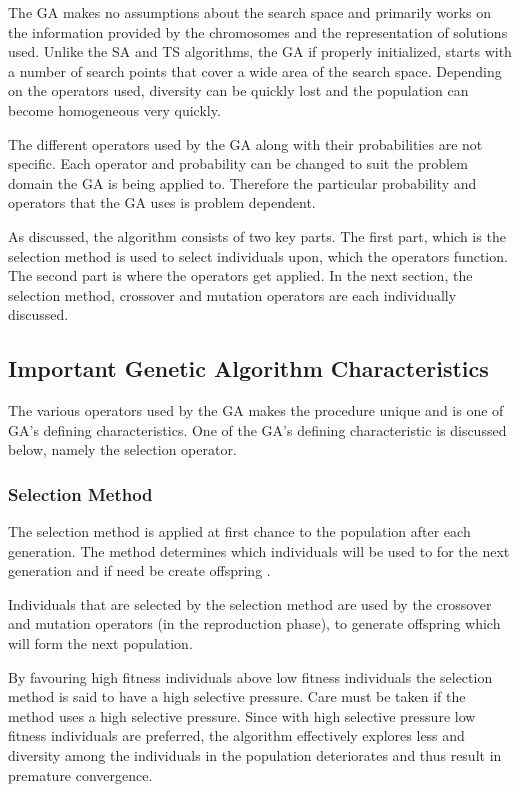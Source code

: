 The \gls{GA} makes no assumptions about the search space and primarily works on the information provided by the chromosomes and the representation of solutions used\cite{CompuIntelligenceIntro,ConstrainedGA,HybridIntelliGA}. Unlike the \gls{SA} and \gls{TS} algorithms, the \gls{GA} if properly initialized, starts with a number of search points that cover a wide area of the search space. Depending on the operators used, diversity can be quickly lost and the population can become homogeneous very quickly\cite{DistributedHierarchicalGA,FamilyGA,HybridIntelliGA}\label{GASearchPoints}.
 
The different operators used by the GA along with their probabilities are not specific. Each operator and probability can be changed to suit the problem domain the GA is being applied to. Therefore the particular probability and operators that the GA uses is problem dependent.

As discussed, the algorithm consists of two key parts. The first part, which is the selection method is used to select individuals upon, which the operators function. The second part is where the operators get applied. In the next section, the selection method, crossover and mutation operators are each individually discussed.

\subsection{Important Genetic Algorithm Characteristics}
The various operators used by the \gls{GA} makes the procedure unique and is one of \gls{GA}'s defining characteristics. One of the \gls{GA}'s defining characteristic is discussed below, namely the selection operator.

\subsubsection{Selection Method}
\label{sec:selectionmethod}
The selection method is applied at first chance to the population after each generation. The method determines which individuals will be used to for the next generation and if need be create offspring \cite{CoactiveFuzzyGA,CombinedBranchBoundGA,ConstrainedGA}.

Individuals that are selected by the selection method are used by the crossover and mutation operators (in the reproduction phase), to generate offspring which will form the next population\cite{AdaptiveSAGA,AcceleratingGA}.

By favouring high fitness individuals above low fitness individuals the selection method is said to have a high selective pressure\cite{CompuIntelligenceIntro}. Care must be taken if the method uses a high selective pressure. Since with high selective pressure low fitness individuals are preferred, the algorithm effectively explores less and diversity among the individuals in the population deteriorates and thus result in premature convergence\cite{ConstrainedGA, CompuIntelligenceIntro}.

